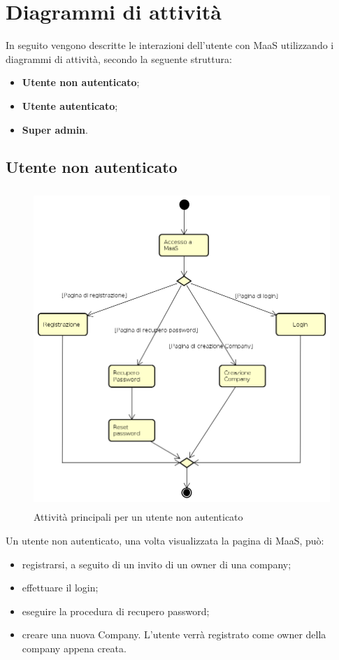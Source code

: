 \section{Diagrammi di attività}
In seguito vengono descritte le interazioni dell'utente con MaaS utilizzando i diagrammi di attività, secondo la seguente struttura:
\begin{itemize}
\item \textbf{Utente non autenticato};
\item \textbf{Utente autenticato};
\item \textbf{Super admin}.
\end{itemize}
\subsection{Utente non autenticato}
\begin{figure}[H]
\begin{center}
\includegraphics[height=12cm]{res/sections/backend/activities/principaliSenzaAuth.png}
\caption{Attività principali per un utente non autenticato}
\end{center}
\end{figure}
Un utente non autenticato, una volta visualizzata la pagina di MaaS, può:
\begin{itemize}
\item registrarsi, a seguito di un invito di un owner di una company;
\item effettuare il login;
\item eseguire la procedura di recupero password;
\item creare una nuova Company. L'utente verrà registrato come owner della company appena creata.
\end{itemize}
